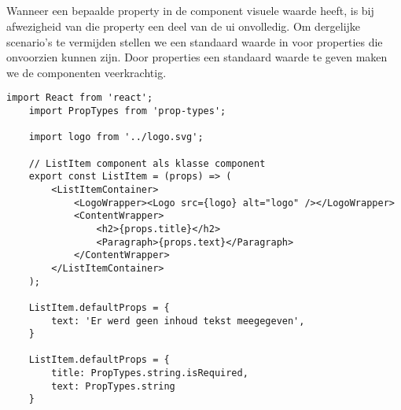 \subsection{}
\label{sec:defaultProps}

Wanneer een bepaalde property in de component visuele waarde heeft, is bij afwezigheid van die property een deel van de \gls{ui} onvolledig. Om dergelijke scenario's te vermijden stellen we een standaard waarde in voor properties die onvoorzien kunnen zijn. Door properties een standaard waarde te geven maken we de componenten veerkrachtig.\\

\begin{lstlisting}[caption=Functioneel component met properties, label={fig:componentWithProps}]
    import React from 'react';
    import PropTypes from 'prop-types';
    
    import logo from '../logo.svg';
    
    // ListItem component als klasse component
    export const ListItem = (props) => (                
        <ListItemContainer>
            <LogoWrapper><Logo src={logo} alt="logo" /></LogoWrapper>
            <ContentWrapper>
                <h2>{props.title}</h2>
                <Paragraph>{props.text}</Paragraph>
            </ContentWrapper>
        </ListItemContainer>
    );
    
    ListItem.defaultProps = {
        text: 'Er werd geen inhoud tekst meegegeven',
    }
    
    ListItem.defaultProps = {
        title: PropTypes.string.isRequired,
        text: PropTypes.string
    }
\end{lstlisting}

\section{}
\label{sec:state}

